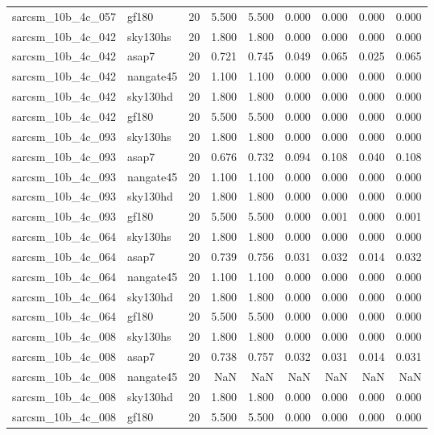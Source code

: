 \begin{tabular}{llrrrrrrr}
sarcsm\_10b\_4c\_057 & gf180 & 20 & 5.500 & 5.500 & 0.000 & 0.000 & 0.000 & 0.000 \\
sarcsm\_10b\_4c\_042 & sky130hs & 20 & 1.800 & 1.800 & 0.000 & 0.000 & 0.000 & 0.000 \\
sarcsm\_10b\_4c\_042 & asap7 & 20 & 0.721 & 0.745 & 0.049 & 0.065 & 0.025 & 0.065 \\
sarcsm\_10b\_4c\_042 & nangate45 & 20 & 1.100 & 1.100 & 0.000 & 0.000 & 0.000 & 0.000 \\
sarcsm\_10b\_4c\_042 & sky130hd & 20 & 1.800 & 1.800 & 0.000 & 0.000 & 0.000 & 0.000 \\
sarcsm\_10b\_4c\_042 & gf180 & 20 & 5.500 & 5.500 & 0.000 & 0.000 & 0.000 & 0.000 \\
sarcsm\_10b\_4c\_093 & sky130hs & 20 & 1.800 & 1.800 & 0.000 & 0.000 & 0.000 & 0.000 \\
sarcsm\_10b\_4c\_093 & asap7 & 20 & 0.676 & 0.732 & 0.094 & 0.108 & 0.040 & 0.108 \\
sarcsm\_10b\_4c\_093 & nangate45 & 20 & 1.100 & 1.100 & 0.000 & 0.000 & 0.000 & 0.000 \\
sarcsm\_10b\_4c\_093 & sky130hd & 20 & 1.800 & 1.800 & 0.000 & 0.000 & 0.000 & 0.000 \\
sarcsm\_10b\_4c\_093 & gf180 & 20 & 5.500 & 5.500 & 0.000 & 0.001 & 0.000 & 0.001 \\
sarcsm\_10b\_4c\_064 & sky130hs & 20 & 1.800 & 1.800 & 0.000 & 0.000 & 0.000 & 0.000 \\
sarcsm\_10b\_4c\_064 & asap7 & 20 & 0.739 & 0.756 & 0.031 & 0.032 & 0.014 & 0.032 \\
sarcsm\_10b\_4c\_064 & nangate45 & 20 & 1.100 & 1.100 & 0.000 & 0.000 & 0.000 & 0.000 \\
sarcsm\_10b\_4c\_064 & sky130hd & 20 & 1.800 & 1.800 & 0.000 & 0.000 & 0.000 & 0.000 \\
sarcsm\_10b\_4c\_064 & gf180 & 20 & 5.500 & 5.500 & 0.000 & 0.000 & 0.000 & 0.000 \\
sarcsm\_10b\_4c\_008 & sky130hs & 20 & 1.800 & 1.800 & 0.000 & 0.000 & 0.000 & 0.000 \\
sarcsm\_10b\_4c\_008 & asap7 & 20 & 0.738 & 0.757 & 0.032 & 0.031 & 0.014 & 0.031 \\
sarcsm\_10b\_4c\_008 & nangate45 & 20 & NaN & NaN & NaN & NaN & NaN & NaN \\
sarcsm\_10b\_4c\_008 & sky130hd & 20 & 1.800 & 1.800 & 0.000 & 0.000 & 0.000 & 0.000 \\
sarcsm\_10b\_4c\_008 & gf180 & 20 & 5.500 & 5.500 & 0.000 & 0.000 & 0.000 & 0.000 \\

\end{tabular}
